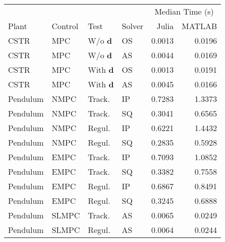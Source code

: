 \begin{tabular}{llllrr}
	
\toprule %

	  &	& & & \multicolumn{2}{c}{Median Time (s)} \\ \cmidrule(l){5-6}
Plant & Control & Test & Solver & Julia & MATLAB \\
\midrule %

CSTR		& MPC	& W/o $\mathbf{d}$	& OS & \num{0.0013} & \num{0.0196}	\\
CSTR		& MPC	& W/o $\mathbf{d}$	& AS & \num{0.0044} & \num{0.0169}	\\
CSTR		& MPC	& With $\mathbf{d}$ & OS & \num{0.0013} & \num{0.0191}	\\
CSTR		& MPC	& With $\mathbf{d}$ & AS & \num{0.0045} & \num{0.0166}	\\
Pendulum 	& NMPC	& Track. 	   		& IP & \num{0.7283} & \num{1.3373}	\\
Pendulum 	& NMPC	& Track. 	   		& SQ & \num{0.3041} & \num{0.6565}	\\
Pendulum    & NMPC	& Regul. 			& IP & \num{0.6221} & \num{1.4432} 	\\
Pendulum    & NMPC	& Regul. 			& SQ & \num{0.2835} & \num{0.5928} 	\\
Pendulum    & EMPC	& Track.			& IP & \num{0.7093} & \num{1.0852} 	\\
Pendulum    & EMPC	& Track.			& SQ & \num{0.3382} & \num{0.7558} 	\\
Pendulum	& EMPC	& Regul. 			& IP & \num{0.6867} & \num{0.8491} 	\\
Pendulum	& EMPC	& Regul. 			& SQ & \num{0.3245} & \num{0.6888}  \\
Pendulum    & SLMPC & Track.			& AS & \num{0.0065} & \num{0.0249}  \\
Pendulum    & SLMPC & Regul.			& AS & \num{0.0064} & \num{0.0244}  \\
	
\bottomrule %
	
\end{tabular}